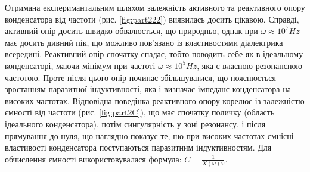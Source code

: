 Отримана експеримантальним шляхом залежність активного та реактивного опору конденсатора від частоти (рис. \ref{fig:part222}) виявилась досить цікавою. Справді, активний опір досить швидко обвалюється, що природньо, однак при $\omega \approx 10^7 Hz$ має досить дивний пік, що можливо пов'язано із властивостями діалектрика всередині. Реактивний опір спочатку спадає, тобто поводить себе як в ідеальному конденсаторі, маючи мінімум при частоті $\omega \approx 10^5 Hz$, яка є власною резонансною частотою. Проте після цього опір починає збільшуватися, що пояснюється зростанням паразитної індуктивності, яка і визначає імпеданс конденсатора на високих частотах. Відповідна поведінка реактивного опору корелює із залежністю ємності від частоти (рис. \ref{fig:part2C}), що має спочатку поличку (область ідеального конденсатора), потім сингулярність у зоні резонансу, і після прямування до нуля, що наглядно показує те, шо при високих частотах ємнісні властивості конденсатора поступаються паразитним індуктивностям. Для обчислення ємності використовувалася формула: $C = \frac{1}{X(\omega)\omega}$.

